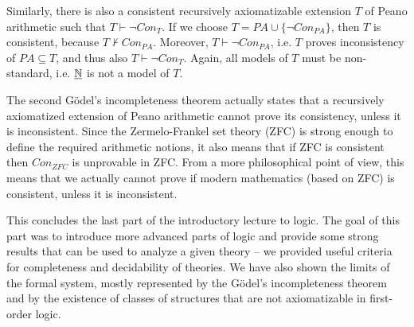 Similarly, there is also a consistent recursively axiomatizable extension $T$ of Peano arithmetic such that $T \vdash \neg Con_T$. If we choose $T = PA \cup \{\neg Con_{PA}\}$, then $T$ is consistent, because $T \nvdash Con_{PA}$. Moreover, $T \vdash \neg Con_{PA}$, i.e. $T$ proves inconsistency of $PA \subseteq T$, and thus also $T \vdash \neg Con_T$. Again, all models of $T$ must be non-standard, i.e. $\underline{\mathbb{N}}$ is not a model of $T$.

The second Gödel's incompleteness theorem actually states that a recursively axiomatized extension of Peano arithmetic cannot prove its consistency, unless it is inconsistent. Since the Zermelo-Frankel set theory (ZFC) is strong enough to define the required arithmetic notions, it also means that if ZFC is consistent then $Con_{ZFC}$ is unprovable in ZFC. From a more philosophical point of view, this means that we actually cannot prove if modern mathematics (based on ZFC) is consistent, unless it is inconsistent.

\bigskip

This concludes the last part of the introductory lecture to logic. The goal of this part was to introduce more advanced parts of logic and provide some strong results that can be used to analyze a given theory -- we provided useful criteria for completeness and decidability of theories. We have also shown the limits of the formal system, mostly represented by the Gödel's incompleteness theorem and by the existence of classes of structures that are not axiomatizable in first-order logic. 
